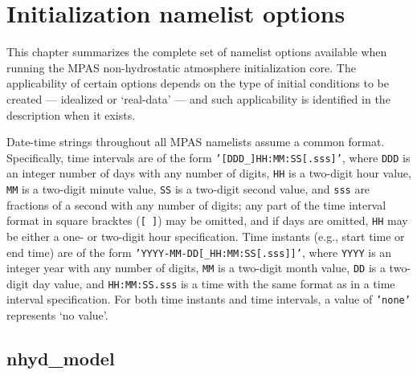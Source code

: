 
\chapter{Initialization namelist options}

This chapter summarizes the complete set of namelist options available when
running the MPAS non-hydrostatic atmosphere initialization core.  The
applicability of certain options depends on the type of initial conditions to be
created --- idealized or `real-data' --- and such applicability is identified in
the description when it exists.

Date-time strings throughout all MPAS namelists assume a common format.
Specifically, time intervals are of the form {\tt '[DDD\_]HH:MM:SS[.sss]'},
where {\tt DDD} is an integer number of days with any number of digits, {\tt HH}
is a two-digit hour value, {\tt MM} is a two-digit minute value, {\tt SS} is a
two-digit second value, and {\tt sss} are fractions of a second with any number
of digits; any part of the time interval format in square bracktes ({\tt [ ]})
may be omitted, and if days are omitted, {\tt HH} may be either a one- or
two-digit hour specification.  Time instants (e.g., start time or end time) are
of the form {\tt 'YYYY-MM-DD[\_HH:MM:SS[.sss]]'}, where {\tt YYYY} is an integer
year with any number of digits, {\tt MM} is a two-digit month value, {\tt DD} is
a two-digit day value, and {\tt HH:MM:SS.sss} is a time with the same format as
in a time interval specification. For both time instants and time intervals, a
value of {\tt 'none'} represents `no value'.

\section{nhyd\_model}

